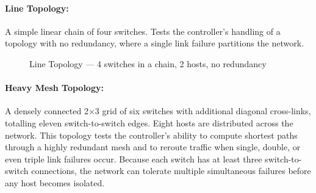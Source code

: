 \documentclass[12pt,a4paper]{article}
\begin{document}
\paragraph{Line Topology:}

A simple linear chain of four switches. Tests the controller's handling of a topology with no redundancy, where a single link failure partitions the network.

\begin{figure}[H]
\centering
{}
\caption{Line Topology --- 4 switches in a chain, 2 hosts, no redundancy}
\end{figure}

\paragraph{Heavy Mesh Topology:}

A densely connected 2$\times$3 grid of six switches with additional diagonal cross-links, totalling eleven switch-to-switch edges. Eight hosts are distributed across the network. This topology tests the controller's ability to compute shortest paths through a highly redundant mesh and to reroute traffic when single, double, or even triple link failures occur. Because each switch has at least three switch-to-switch connections, the network can tolerate multiple simultaneous failures before any host becomes isolated.
\end{document}
